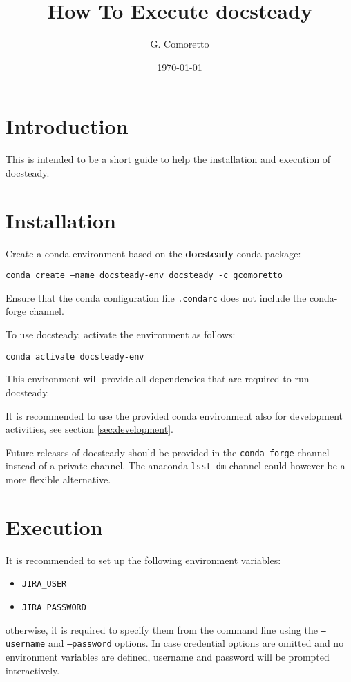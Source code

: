 \documentclass[DM]{lsstdoc}
\author{G. Comoretto}
\begin{document}
\date{\today}

\title{How To Execute docsteady}
\mkshorttitle

\section{Introduction}

This is intended to be a short guide to help the installation and  execution of docsteady.


\section{Installation}\label{sec:install}

Create a conda environment based on the \textbf{docsteady} conda package:

\texttt{conda create --name docsteady-env docsteady -c gcomoretto}

Ensure that the conda configuration file  \texttt{.condarc} does not include the conda-forge channel.

To use docsteady, activate the environment as follows:

\texttt{conda activate docsteady-env}

This environment will provide all dependencies that are required to run docsteady.

It is recommended to use the provided conda environment also for development activities, see section \ref{sec:development}.

Future releases of docsteady should be provided in the \texttt{conda-forge} channel instead of a private channel. 
The anaconda \texttt{lsst-dm} channel could however be a more flexible alternative.



\section{Execution}

It is recommended to set up the following environment variables:

\begin{itemize}
\item \texttt{JIRA\_USER}
\item \texttt{JIRA\_PASSWORD}
\end{itemize}

otherwise, it is required to specify them from the command line using the \texttt{--username} and \texttt{--password} options.
In case credential options are omitted and no environment variables are defined, username and password will be prompted interactively.
\end{document}
